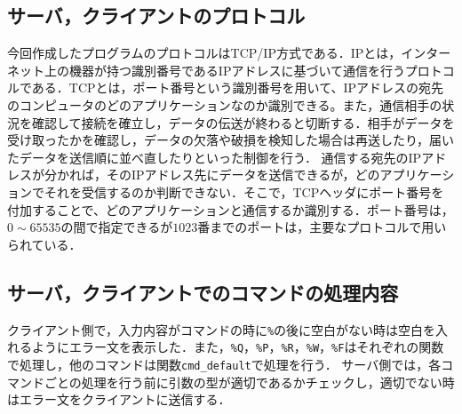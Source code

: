 \documentclass{jarticle}[11pt]
\begin{document}
\subsection{サーバ，クライアントのプロトコル}
今回作成したプログラムのプロトコルはTCP/IP方式である．IPとは，インターネット上の機器が持つ識別番号であるIPアドレスに基づいて通信を行うプロトコルである．TCPとは，ポート番号という識別番号を用いて、IPアドレスの宛先のコンピュータのどのアプリケーションなのか識別できる。また，通信相手の状況を確認して接続を確立し，データの伝送が終わると切断する．相手がデータを受け取ったかを確認し，データの欠落や破損を検知した場合は再送したり，届いたデータを送信順に並べ直したりといった制御を行う．
通信する宛先のIPアドレスが分かれば，そのIPアドレス先にデータを送信できるが，どのアプリケーションでそれを受信するのか判断できない．そこで，TCPヘッダにポート番号を付加することで、どのアプリケーションと通信するか識別する．ポート番号は，$0\sim65535$の間で指定できるが$1023$番までのポートは，主要なプロトコルで用いられている． 

\subsection{サーバ，クライアントでのコマンドの処理内容}
クライアント側で，入力内容がコマンドの時に\verb|%|の後に空白がない時は空白を入れるようにエラー文を表示した．また，\verb|%Q|，\verb|%P|，\verb|%R|，\verb|%W|，\verb|%F|はそれぞれの関数で処理し，他のコマンドは関数\verb|cmd_default|で処理を行う．
サーバ側では，各コマンドごとの処理を行う前に引数の型が適切であるかチェックし，適切でない時はエラー文をクライアントに送信する．\\
\end{document}
